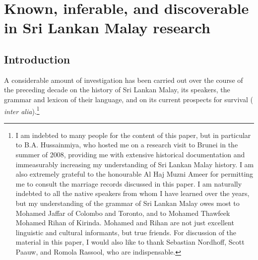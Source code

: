   
\chapter[Known, inferable, and discoverable in SLM research]{Known, inferable, and discoverable in Sri Lankan Malay research}

\section{Introduction}%

A considerable amount of investigation has been carried out over the course of the preceding decade on the history of Sri Lankan Malay, its speakers, the grammar and lexicon of their language, and on its current prospects for survival (\citet{Ansaldo2008genesis,Ansaldo2011a,LimEtAl2006,LimEtAl2007,AnsaldoEtAl2009,Nordhoff2009,Slomanson2006cll,Slomanson2008lingua,Slomanson2009,Slomanson2011,SmithEtAl2004,SmithEtAl2006cll} \textit{inter alia}).\footnote{I
  am indebted to many people for the content of this paper, but in particular to B.A. Hussainmiya, who hosted me on a research visit to Brunei in the summer of 2008, providing me with extensive historical documentation and immeasurably increasing my understanding of Sri Lankan Malay history. I am also extremely grateful to the honourable Al Haj Muzni Ameer for permitting me to consult the marriage records discussed in this paper. I am naturally indebted to all the native speakers from whom I have learned over the years, but my understanding of the grammar of Sri Lankan Malay owes most to Mohamed Jaffar of Colombo and Toronto, and to Mohamed Thawfeek Mohamed Rihan of Kirinda. Mohamed and Rihan are not just excellent linguistic and cultural informants, but true friends. For discussion of the material in this paper, I would also like to thank Sebastian Nordhoff, Scott Paauw, and Romola Rassool, who are indispensable.
} 

